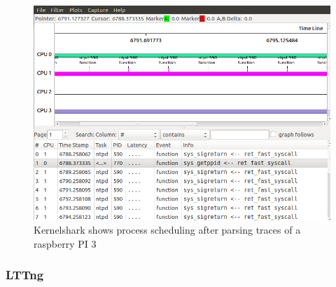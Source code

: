 \begin{itemize}
		\begin{figure}[H]
			\centering
        	\includegraphics[scale=0.32]{img/solution/kernelshark-task-schedule.png}
        	\caption{Kernelshark shows process scheduling after parsing traces of a raspberry PI 3}
        	\label{Kernelshark shows process scheduling after parsing traces of a raspberry PI 3}
    	\end{figure}




\end{itemize}


\subsubsection{LTTng}


